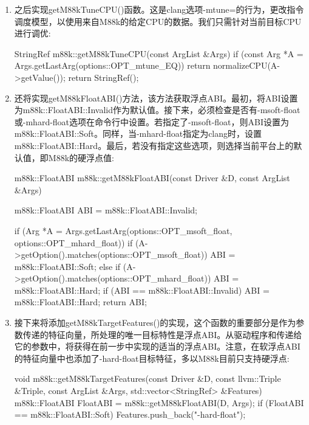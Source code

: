 \begin{enumerate}
\item
之后实现getM88kTuneCPU()函数。这是clang选项-mtune=的行为，更改指令调度模型，以使用来自M88k的给定CPU的数据。我们只需针对当前目标CPU进行调优:

\begin{cpp}
StringRef m88k::getM88kTuneCPU(const ArgList &Args) {
    if (const Arg *A = Args.getLastArg(options::OPT_mtune_EQ))
        return normalizeCPU(A->getValue());
    return StringRef();
}
\end{cpp}

\item
还将实现getM88kFloatABI()方法，该方法获取浮点ABI。最初，将ABI设置为m88k::FloatABI::Invalid作为默认值。接下来，必须检查是否有-msoft-float或-mhard-float选项在命令行中设置。若指定了-msoft-float，则ABI设置为m88k::FloatABI::Soft。同样，当-mhard-float指定为clang时，设置m88k::FloatABI::Hard。最后，若没有指定这些选项，则选择当前平台上的默认值，即M88k的硬浮点值:

\begin{cpp}
m88k::FloatABI m88k::getM88kFloatABI(const Driver &D, const
ArgList &Args) {
    m88k::FloatABI ABI = m88k::FloatABI::Invalid;

    if (Arg *A =
        Args.getLastArg(options::OPT_msoft_float,
    options::OPT_mhard_float)) {
        if (A->getOption().matches(options::OPT_msoft_float))
            ABI = m88k::FloatABI::Soft;
        else if (A->getOption().matches(options::OPT_mhard_float))
            ABI = m88k::FloatABI::Hard;
    }
    if (ABI == m88k::FloatABI::Invalid)
        ABI = m88k::FloatABI::Hard;
    return ABI;
}
\end{cpp}

\item
接下来将添加getM88kTargetFeatures()的实现，这个函数的重要部分是作为参数传递的特征向量，所处理的唯一目标特性是浮点ABI。从驱动程序和传递给它的参数中，将获得在前一步中实现的适当的浮点ABI。注意，在软浮点ABI的特征向量中也添加了-hard-float目标特征，多以M88k目前只支持硬浮点:

\begin{cpp}
void m88k::getM88kTargetFeatures(const Driver &D,
                                 const llvm::Triple &Triple,
                                 const ArgList &Args,
                                 std::vector<StringRef> &Features) {
    m88k::FloatABI FloatABI = m88k::getM88kFloatABI(D, Args);
    if (FloatABI == m88k::FloatABI::Soft)
        Features.push_back("-hard-float");
}
\end{cpp}

\end{enumerate}


